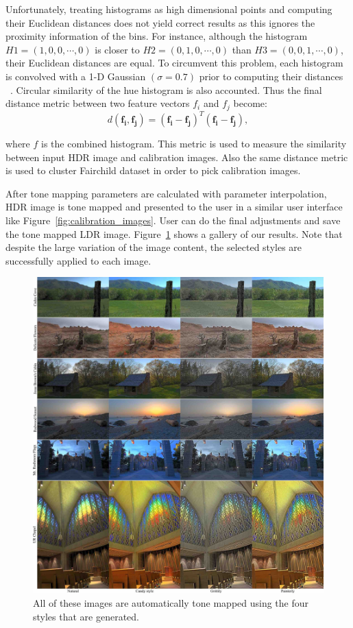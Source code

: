 Unfortunately, treating histograms as high dimensional points and computing their Euclidean distances does not yield correct results as this ignores the proximity information of the bins. For instance, although the histogram $H1 = (1, 0, 0, \cdots, 0)$ is closer to
$H2 = (0, 1, 0, \cdots, 0)$ than $H3 = (0, 0, 1, \cdots, 0)$, their Euclidean distances are equal. To circumvent this problem, each histogram is convolved with a 1-D Gaussian $(\sigma = 0.7)$ prior to computing their distances ~\cite{Ben2006}. Circular similarity of the hue histogram is also accounted. Thus the final distance metric between two feature vectors \textbf{$f_i$} and \textbf{$f_j$} become:
\begin{equation}
    d(\mathbf{f_i, f_j}) = \mathbf{(f_i - f_j)}^T\mathbf{(f_i-f_j)},
\end{equation}

where \textbf{$f$} is the combined histogram. This metric is used to measure the similarity between input HDR image and calibration images. Also the same distance metric is used to cluster Fairchild dataset in order to pick calibration images.

After tone mapping parameters are calculated with parameter interpolation, HDR image is tone mapped and presented to the user in a similar user interface like Figure~\ref{fig:calibration_images}. User can do the final adjustments and save the tone mapped LDR image. Figure~\ref{fig:gallery} shows a gallery of our results. Note that despite the large variation of the image content, the selected styles are successfully applied to each image.

\begin{figure}
\begin{center}
\includegraphics[width=\textwidth]{figures/chapter5/style_based/gallery_small.jpg}
\caption{All of these images are automatically tone mapped using the four styles that are generated.}
\label{fig:gallery}
\end{center}
\end{figure}